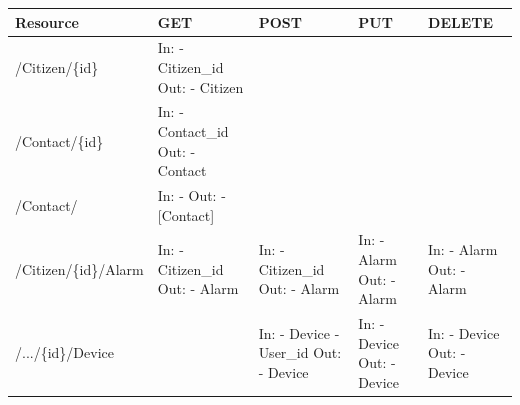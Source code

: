 \begin{table}[H]
    \centering
    \begin{tabular}{|l|p{2cm}|p{2cm}|p{2cm}|p{2cm}|} \hline
         Resource & GET & POST & PUT & DELETE \\ \hline
         /Citizen/\{id\} & In: \newline - Citizen\_id \newline Out:  \newline - Citizen & \cellcolor{gray!40} & \cellcolor{gray!40} & \cellcolor{gray!40} \\ \hline
         /Contact/\{id\} & In: \newline - Contact\_id \newline Out: \newline - Contact & \cellcolor{gray!40} & \cellcolor{gray!40} & \cellcolor{gray!40} \\ \hline
         /Contact/ & In: \newline - \newline Out:  \newline - [Contact] & \cellcolor{gray!40} & \cellcolor{gray!40} & \cellcolor{gray!40} \\ \hline
         /Citizen/\{id\}/Alarm & In: \newline - Citizen\_id \newline Out: \newline - Alarm & In: \newline - Citizen\_id \newline Out: \newline - Alarm & In: \newline - Alarm \newline Out: \newline - Alarm & In: \newline - Alarm \newline Out: \newline - Alarm \\ \hline
         /.../\{id\}/Device & \cellcolor{gray!40} & In: \newline - Device \newline - User\_id \newline Out: \newline - Device & In: \newline - Device \newline Out: \newline - Device & In: \newline - Device \newline Out: \newline - Device \\ \hline

\end{tabular}
\end{table}
